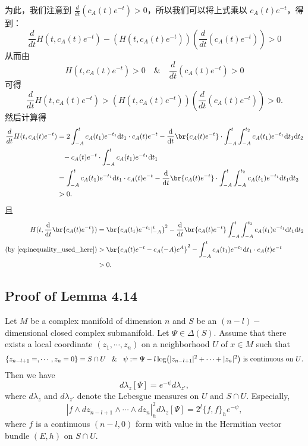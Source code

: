 为此，我们注意到 $\frac{d}{dt}(c_{A}(t)e^{-t}) > 0$，所以我们可以将上式乘以 $c_{A}(t)e^{-t}$，得到：
\[ \frac{d}{dt}H(t,c_{A}(t)e^{-t})-(H(t,c_{A}(t)e^{-t}))(\frac{d}{dt}(c_{A}(t)e^{-t})) > 0 \]
从而由
\[
  H(t,c_{A}(t)e^{-t})>0  \quad  \& \quad \frac{d}{dt}(c_{A}(t)e^{-t})>0
\]
可得
\[
  \frac{d}{dt}H(t,c_{A}(t)e^{-t})>(H(t,c_{A}(t)e^{-t}))(\frac{d}{dt}(c_{A}(t)e^{-t})) > 0.
\]
然后计算得
\begin{equation}
  \label{eq:inequality_used_here}
  \begin{aligned}
  \frac{d}{dt}H(t,c_{A}(t)e^{-t}) &= 2 \int_{-A}^t c_A(t_1) e^{-t_1} \dd t_1\cdot c_A(t)e^{-t} -\Dif{t}\br{c_A(t)e^{-t}}\cdot \int_{-A}^t  \int_{-A}^{t_2} c_A(t_1) e^{-t_1} \dd t_1\dd t_2\\
  &\phantom{=}-c_A(t)e^{-t} \cdot \int_{-A}^t c_A(t_1) e^{-t_1} \dd t_1\\ 
  &=\int_{-A}^t c_A(t_1) e^{-t_1} \dd t_1\cdot c_A(t)e^{-t} -\Dif{t}\br{c_A(t)e^{-t}}\cdot \int_{-A}^t  \int_{-A}^{t_2} c_A(t_1) e^{-t_1} \dd t_1\dd t_2\\
  &>0.
\end{aligned}
\end{equation}
  且
  \begin{align*}
    H(t,\Dif{t}\br{c_A(t)e^{-t}}) &=\br{c_A(t_1)e^{-t_1}|_{-A}^t}^2-\Dif{t}\br{c_A(t)e^{-t}}\int_{-A}^t  \int_{-A}^{t_2} c_A(t_1) e^{-t_1} \dd t_1\dd t_2\\ 
    (\text{by \eqref{eq:inequality_used_here}})&>\br{c_A(t)e^{-t}-c_A(-A)e^{A}}^2-\int_{-A}^t c_A(t_1) e^{-t_1} \dd t_1\cdot c_A(t)e^{-t} \\ 
    &>0.
  \end{align*}
    
\begin{remark}
  
\end{remark}

\subsection{Proof of Lemma 4.14}

\begin{lem}\label{l:lem9}
  Let $M$ be a complex manifold of dimension $n$ and $S$ be an
  $(n-l)-$dimensional closed complex submanifold. Let
  $\Psi\in\Delta(S)$. Assume that there exists a local coordinate
  $(z_{1},\cdots,z_{n})$ on a neighborhood $U$ of $x\in M$ such that
  \[
    \{z_{n-l+1}=,\cdots,z_{n}=0\}=S\cap U \;\And\;\psi:=\Psi-l\log(|z_{n-l+1}|^{2}+\cdots+|z_{n}|^{2}) \text{ is continuous
    on $U$.}
  \]
  Then we have $$d\lambda_{z}[\Psi]=e^{-\psi}d\lambda_{z'},$$
  where $d\lambda_{z}$ and $d\lambda_{z'}$ denote the Lebesgue
  measures on $U$ and $S\cap U$. Especially,
  $$|f\wedge dz_{n-l+1}\wedge\cdots\wedge dz_{n}|^{2}_{h}d\lambda_{z}[\Psi]
  =2^{l}\{f, f\}_{h}e^{-\psi},$$ where $f$ is a continuous $(n-l,0)$
  form with value in the Hermitian vector bundle $(E,h)$ on $S\cap U$.
  \end{lem}
  
